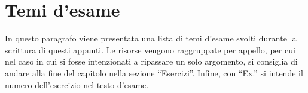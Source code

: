 \documentclass[a4paper]{article}
\newcommand{\dquotes}[1]{``#1''}
\begin{document}
	\newpage
	\newpage
	\newpage
	\section{Temi d'esame}

	In questo paragrafo viene presentata una lista di temi d'esame svolti durante la scrittura di questi appunti. Le risorse vengono raggruppate per appello, per cui nel caso in cui si fosse intenzionati a ripassare un solo argomento, si consiglia di andare alla fine del capitolo nella sezione \dquotes{Esercizi}. Infine, con \dquotes{Ex.} si intende il numero dell'esercizio nel testo d'esame.
\end{document}
